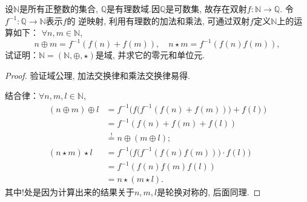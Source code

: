 \begin{problem}\label{ex:1.1.4}
    设$\mathbb{N}$是所有正整数的集合, $\mathbb{Q}$是有理数域.因$\mathbb{Q}$是可数集, 
故存在双射$f:\mathbb{N} \to \mathbb{Q}$. 令$f^{-1}:\mathbb{Q} \to \mathbb{N}$表示$f$的
逆映射, 利用有理数的加法和乘法, 可通过双射$f$定义$\mathbb{N}$上的运算如下：
$\forall n, m \in \mathbb{N}$, 
\[
    n \oplus m = f^{-1}(f(n) + f(m)), \quad n \star m = f^{-1}(f(n)f(m)),
\]
试证明：$\mathbb{N} = (\mathbb{N}, \oplus, \star)$是域, 并求它的零元和单位元.
\end{problem}

\begin{proof}
    验证域公理, 加法交换律和乘法交换律易得.

    结合律：$\forall n, m, l \in \mathbb{N}$,
\[
\begin{aligned}
    (n \oplus m) \oplus l &= f^{-1}\biggl(f\bigl(f^{-1}(f(n) + f(m))\bigr)+ f(l)\biggr)\\
    &= f^{-1}(f(n) + f(m) + f(l)) \\
    &\overset{!}= n \oplus (m \oplus l);\\
    (n \star m) \star l &= f^{-1}\biggl(f\bigl(f^{-1}(f(n)f(m))\bigr) \cdot f(l)\biggr)\\
    &= f^{-1}(f(n)f(m)f(l)) \\
    &= n \star (m \star l).
\end{aligned}
\]
其中!处是因为计算出来的结果关于$n, m, l$是轮换对称的, 后面同理.


\end{proof}
